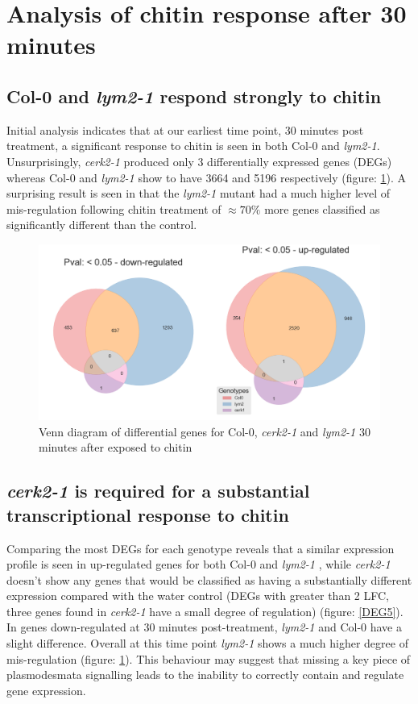 \documentclass[../main.tex]{subfiles}
\begin{document}
\section{Analysis of chitin response after 30 minutes}
\label{sec:seqresults}

\subsection{Col-0 and \textit{lym2-1} respond strongly to chitin}

Initial analysis indicates that at our earliest time point, 30 minutes post
treatment, a significant response to chitin is seen in both Col-0 and
\textit{lym2-1}. Unsurprisingly, \textit{cerk2-1} produced only 3 differentially
expressed genes (DEGs) whereas Col-0 and \textit{lym2-1} show to have 3664 and
5196 respectively (figure: \ref{fig:05hrDEGs}). A surprising result is seen in that the
\textit{lym2-1} mutant had a much higher level of mis-regulation following
chitin treatment of $\approx70\%$ more genes classified as significantly different
than the control.

\begin{figure}[ht]
  \centering
  \includegraphics[width=0.8\columnwidth]{figures/vennTreatmentschitin.png}
  \caption{\label{fig:05hrDEGs} Venn diagram of differential genes for Col-0,
    \textit{cerk2-1} and \textit{lym2-1} 30 minutes after exposed to chitin}
\end{figure}

\subsection{\textit{cerk2-1} is required for a substantial transcriptional response to chitin}

Comparing the most DEGs for each genotype reveals that a similar expression
profile is seen in up-regulated genes for both Col-0 and \textit{lym2-1} , while
\textit{cerk2-1} doesn't show any genes that would be classified as having a
substantially different expression compared with the water control (DEGs with
greater than 2 LFC, three genes found in \textit{cerk2-1} have a small degree of
regulation) (figure: \ref{DEG5}). In genes down-regulated at 30
minutes post-treatment, \textit{lym2-1} and Col-0 have a slight difference.
Overall at this time point \textit{lym2-1} shows a much higher degree of
mis-regulation (figure: \ref{fig:05hrDEGs}). This behaviour may suggest that
missing a key piece of plasmodesmata signalling leads to the inability to
correctly contain and regulate gene expression.
\end{document}
